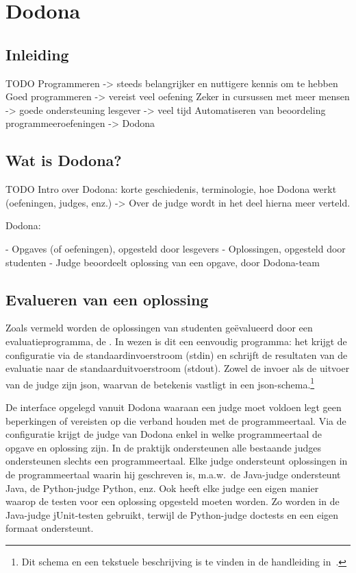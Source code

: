 \chapter{Dodona}\label{ch:dodona}

\section{Inleiding}\label{sec:inleiding}

TODO
Programmeren -> steeds belangrijker en nuttigere kennis om te hebben
Goed programmeren -> vereist veel oefening
Zeker in cursussen met meer mensen -> goede ondersteuning lesgever -> veel tijd
Automatiseren van beoordeling programmeeroefeningen -> Dodona

\section{Wat is Dodona?}\label{sec:wat-is-dodona}

TODO
Intro over Dodona: korte geschiedenis, terminologie, hoe Dodona werkt (oefeningen, judges, enz.)
-> Over de judge wordt in het deel hierna meer verteld.

Dodona:

- Opgaves (of oefeningen), opgesteld door lesgevers
- Oplossingen, opgesteld door studenten
- Judge beoordeelt oplossing van een opgave, door Dodona-team

\section{Evalueren van een oplossing}\label{sec:evalueren-van-een-oplossing}

Zoals vermeld worden de oplossingen van studenten geëvalueerd door een evaluatieprogramma, de .
In wezen is dit een eenvoudig programma: het krijgt de configuratie via de standaardinvoerstroom (stdin) en schrijft de resultaten van de evaluatie naar de standaarduitvoerstroom (stdout).
Zowel de invoer als de uitvoer van de judge zijn json, waarvan de betekenis vastligt in een json-schema.\footnote{Dit schema en een tekstuele beschrijving is te vinden in de handleiding in~\autocite{dodona2020}.}

De interface opgelegd vanuit Dodona waaraan een judge moet voldoen legt geen beperkingen of vereisten op die verband houden met de programmeertaal.
Via de configuratie krijgt de judge van Dodona enkel in welke programmeertaal de opgave en oplossing zijn.
In de praktijk ondersteunen alle bestaande judges ondersteunen slechts een programmeertaal.
Elke judge ondersteunt oplossingen in de programmeertaal waarin hij geschreven is, m.a.w.\ de Java-judge ondersteunt Java, de Python-judge Python, enz.
Ook heeft elke judge een eigen manier waarop de testen voor een oplossing opgesteld moeten worden.
Zo worden in de Java-judge jUnit-testen gebruikt, terwijl de Python-judge doctests en een eigen formaat ondersteunt.

